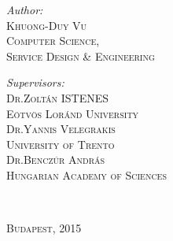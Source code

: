\documentclass[a4paper,12pt,times,numbered,print,index]{Classes/PhDThesisPSnPDF}
\begin{document}
\begin{titlepage}
\begin{center}
		\begin{minipage}{0.43\textwidth}
			\begin{flushleft} \large	
				\emph{Author:}\\
				\textsc{Khuong-Duy Vu \\ \small Computer Science, \\\hspace{0cm}Service Design \& Engineering  \\\hspace{0cm}} %
			\end{flushleft}
		\end{minipage}
		\begin{minipage}{0.56\textwidth}
			\begin{flushright} \large
				\emph{Supervisors:} \\
				\textsc{Dr.Zoltán ISTENES \\ \small Eötvös Loránd University\\[0.3cm] }
				\textsc{Dr.Yannis Velegrakis \\ \small University of Trento\\[0.3cm] }
				\textsc{Dr.Benczúr András \\ \small Hungarian Academy of Sciences\\[0.3cm] }
			\end{flushright}
		\end{minipage}\\[1cm]
		
			\begin{minipage}{0.37\textwidth}
				\begin{flushleft} \large	
					
				\end{flushleft}
			\end{minipage}
			
			
		\textsc{{\large Budapest, 2015}}\\[4cm] 
		
		\vfill
	\end{center}
	
\end{titlepage}




%
%
%
%
%
\end{document}
